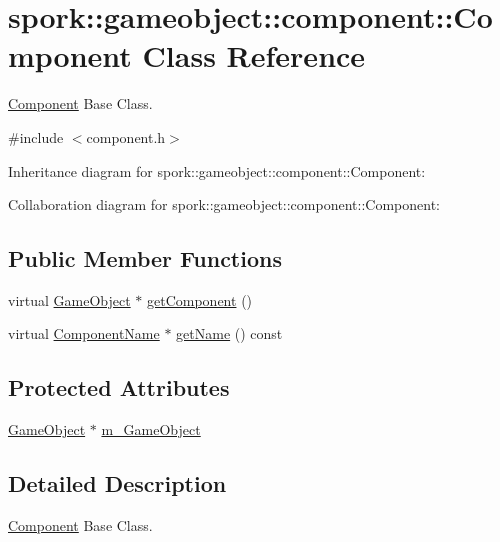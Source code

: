 \hypertarget{classspork_1_1gameobject_1_1component_1_1_component}{}\section{spork\+:\+:gameobject\+:\+:component\+:\+:Component Class Reference}
\label{classspork_1_1gameobject_1_1component_1_1_component}


\hyperlink{classspork_1_1gameobject_1_1component_1_1_component}{Component} Base Class.  




{\ttfamily \#include $<$component.\+h$>$}



Inheritance diagram for spork\+:\+:gameobject\+:\+:component\+:\+:Component\+:


Collaboration diagram for spork\+:\+:gameobject\+:\+:component\+:\+:Component\+:
\subsection*{Public Member Functions}
\begin{DoxyCompactItemize}
\item 
virtual \hyperlink{classspork_1_1gameobject_1_1_game_object}{Game\+Object} $\ast$ \hyperlink{classspork_1_1gameobject_1_1component_1_1_component_a11b1d17611783ab6e909635bb0dc77c8}{get\+Component} ()
\item 
virtual \hyperlink{structspork_1_1gameobject_1_1component_1_1_component_name}{Component\+Name} $\ast$ \hyperlink{classspork_1_1gameobject_1_1component_1_1_component_ac47356483f2a091e46ad7aaf99cb1595}{get\+Name} () const
\end{DoxyCompactItemize}
\subsection*{Protected Attributes}
\begin{DoxyCompactItemize}
\item 
\hyperlink{classspork_1_1gameobject_1_1_game_object}{Game\+Object} $\ast$ \hyperlink{classspork_1_1gameobject_1_1component_1_1_component_a54dec04fa629b64bd5fb2191b2ad8a7e}{m\+\_\+\+Game\+Object}
\end{DoxyCompactItemize}


\subsection{Detailed Description}
\hyperlink{classspork_1_1gameobject_1_1component_1_1_component}{Component} Base Class. 

